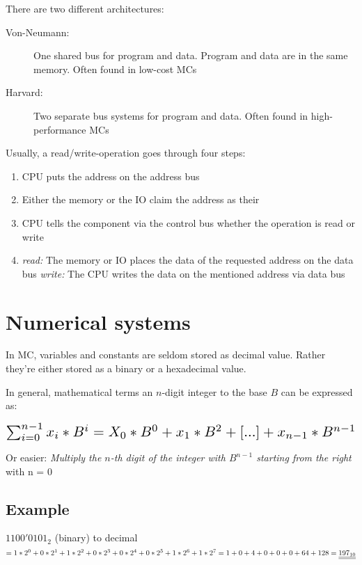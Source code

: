 \documentclass[a4paper, 11pt, nofootinbib]{book}
\begin{document}
\noindent There are two different architectures:

\begin{description}
	\item[Von-Neumann: ] One shared bus for program and data. Program and data are in the same memory. Often found in low-cost MCs
	\item[Harvard: ] Two separate bus systems for program and data. Often found in high-performance MCs
\end{description}
\vspace{10px}

\noindent Usually, a read/write-operation goes through four steps:

\begin{enumerate}
	\item CPU puts the address on the address bus
	\item Either the memory or the IO claim the address as their
	\item CPU tells the component via the control bus whether the operation is read or write
	\item 
		\subitem \textit{read: } The memory or IO places the data of the requested address on the data bus
		\subitem \textit{write: } The CPU writes the data on the mentioned address via data bus
\end{enumerate}

\section{Numerical systems}
In MC, variables and constants are seldom stored as decimal value. Rather they're either stored as a binary or a hexadecimal value. 

In general, mathematical terms an $n$-digit integer to the base $B$ can be expressed as:

\[ \scalebox{1.5}{$ \sum_{i=0}^{n-1} x_{i} * B^i = X_{0} * B^0 + x_{1} * B^2 + [...] + x_{n-1} * B^{n-1} $} \]

\noindent Or easier: \textit{Multiply the $n$-th digit of the integer with $B^{n-1}$ starting from the right} with n = 0

\subsection{Example}

\noindent $1100'0101_{2}$ (binary) to decimal \\
$
	= 1*2^0 + 0*2^1 + 1*2^2 + 0*2^3 + 0*2^4 + 0*2^5 + 1*2^6 + 1*2^7 \\
	=   1   +   0   +   4   +   0   +   0   +  0   +   64   +  128 \\
	=   \underline{\underline{197_{10}}}
$
\end{document}
